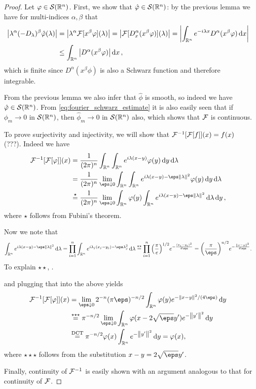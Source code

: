 \begin{proof}
	Let $\varphi \in \mathcal S(\mathbb R^n)$. First, we show that $\hat{\varphi} \in \mathcal S(\mathbb R^n)$: by the previous lemma we have for multi-indices $\alpha, \beta$ that
	\begin{align}
		\abs{\lambda^\alpha (-D_\lambda)^\beta \hat{\varphi}(\lambda)} &= \abs{\lambda^\alpha \mathcal F[x^\beta\varphi](\lambda)} = \abs{\mathcal F[D^\alpha_x (x^\beta\varphi)](\lambda)} = \abs{\int_{\mathbb R^n} e^{-i\lambda x} D^\alpha(x^\beta\varphi) \dd{x}} \nonumber \\
		&\leq \int_{\mathbb R^n} \abs{D^\alpha (x^\beta\varphi)} \dd{x} \label{eq:fourier_schwarz_estimate},
	\end{align}
which is finite since $D^\alpha (x^\beta\phi)$ is also a Schwarz function and therefore integrable. 

From the previous lemma we also infer that $\hat\phi$ is smooth, so indeed we have $\hat{\varphi} \in \mathcal S(\mathbb R^n)$. 
From \cref{eq:fourier_schwarz_estimate} it is also easily seen that if $\phi_m \to 0$ in $\mathcal S(\mathbb R^n)$, then $\hat\phi_m \to 0$ in $\mathcal S(\mathbb R^n)$ also, which shows that $\mathcal F$ is continuous. 

To prove surjectivity and injectivity, we will show that $\mathcal F^{-1}[\mathcal F[f]](x) = f(x)$ (???). Indeed we have
\begin{align*}
	\FF^{-1} [\FF[\phi]](x) &= \frac{1}{(2\pi)^n} \int_{\RR^n} \int_{\RR^n} e^{i\lambda (x-y)} \phi(y) \dd{y}\dd{\lambda} \\
	&= \frac{1}{(2\pi)^n} \lim_{\eps \downarrow 0} \int_{\RR^n} \int_{\RR^n} e^{i \lambda ( x- y) - \eps\norm{\lambda}^2} \phi(y) \dd{y}\dd{\lambda} \\
	&\overset\star= \frac{1}{(2\pi)^n}\lim_{\eps \downarrow 0} \int_{\RR^n} \phi(y)\int_{\RR^n} e^{i\lambda(x- y) - \eps\norm{\lambda}^2} \dd{\lambda} \dd{y},
\end{align*}
where $\star$ follows from Fubini's theorem. 

Now we note that 
\[
\int_{\RR^n} e^{i\lambda(x-y) - \eps\norm{\lambda}^2} \dd{\lambda} = \prod_{i=1}^n \int_{\RR^n} e^{i\lambda_j(x_j - y_j) - \eps\lambda_j^2} \dd{\lambda} \overset{\star\star}= \prod_{i=1}^n \qty(\frac\pi e)^{1/2} e^{- \frac{(x_i - y_i)^2}{4\eps}} = \qty(\frac\pi\eps)^{n/2} e^{- \frac{\norm{x - y}^2}{4\eps}}.
\] 
To explain $\star\star$, \TODO. 


and plugging that into the above yields 
\begin{align*}
\FF^{-1}[\FF[\phi]](x) &= \lim_{\eps\downarrow 0} 2^{-n}(\pi \eps)^{-n/2} \int_{\RR^n} \phi(y) e^{-\norm{x-y}^2/(4\eps)} \dd{y} \\
&\overset{\star\star\star}= \pi^{-n/2} \lim_{\eps\downarrow0}\int_{\RR^n} \phi(x - 2\sqrt\eps y') e^{-\norm{y'}^2} \dd{y} \\
&\overset{\text{DCT}}=\pi^{-n/2} \phi(x) \int_{\RR^n} e^{-\norm{y'}^2} \dd{y} = \phi(x),
\end{align*}
where $\star\star\star$ follows from the substitution $x - y = 2\sqrt\eps y'$.

Finally, continuity of $\mathcal F^{-1}$ is easily shown with an argument analogous to that for continuity of $\mathcal F$. 
\end{proof}

